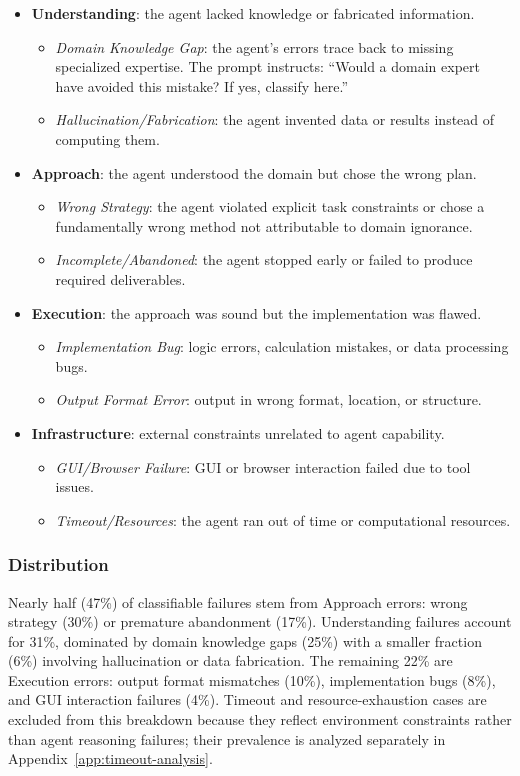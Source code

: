 \begin{itemize}[leftmargin=*,itemsep=2pt]
    \item \textbf{Understanding}: the agent lacked knowledge or fabricated information.
    \begin{itemize}[itemsep=1pt]
        \item \emph{Domain Knowledge Gap}: the agent's errors trace back to missing specialized expertise. The prompt instructs: ``Would a domain expert have avoided this mistake? If yes, classify here.''
        \item \emph{Hallucination/Fabrication}: the agent invented data or results instead of computing them.
    \end{itemize}
    \item \textbf{Approach}: the agent understood the domain but chose the wrong plan.
    \begin{itemize}[itemsep=1pt]
        \item \emph{Wrong Strategy}: the agent violated explicit task constraints or chose a fundamentally wrong method not attributable to domain ignorance.
        \item \emph{Incomplete/Abandoned}: the agent stopped early or failed to produce required deliverables.
    \end{itemize}
    \item \textbf{Execution}: the approach was sound but the implementation was flawed.
    \begin{itemize}[itemsep=1pt]
        \item \emph{Implementation Bug}: logic errors, calculation mistakes, or data processing bugs.
        \item \emph{Output Format Error}: output in wrong format, location, or structure.
    \end{itemize}
    \item \textbf{Infrastructure}: external constraints unrelated to agent capability.
    \begin{itemize}[itemsep=1pt]
        \item \emph{GUI/Browser Failure}: GUI or browser interaction failed due to tool issues.
        \item \emph{Timeout/Resources}: the agent ran out of time or computational resources.
    \end{itemize}
\end{itemize}

\subsubsection{Distribution}
Nearly half (47\%) of classifiable failures stem from Approach errors: wrong strategy (30\%) or premature abandonment (17\%).
Understanding failures account for 31\%, dominated by domain knowledge gaps (25\%) with a smaller fraction (6\%) involving hallucination or data fabrication.
The remaining 22\% are Execution errors: output format mismatches (10\%), implementation bugs (8\%), and GUI interaction failures (4\%).
Timeout and resource-exhaustion cases are excluded from this breakdown because they reflect environment constraints rather than agent reasoning failures; their prevalence is analyzed separately in Appendix~\ref{app:timeout-analysis}.

